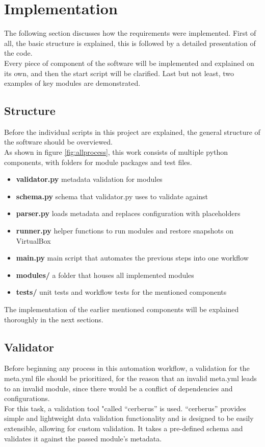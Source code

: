 \chapter{Implementation}
The following section discusses how the requirements were implemented. First of all, the basic structure is explained, this is followed by a detailed presentation of the code.\\
Every piece of component of the software will be implemented and explained on its own, and then the start script will be clarified. Last but not least, two examples of key modules are demonstrated.\\

\section{Structure}
Before the individual scripts in this project are explained, the general structure of the software should be overviewed.\\
As shown in figure \ref{fig:allprocess}, this work consists of multiple python components, with folders for module packages and test files.\\

\begin{itemize}
  \item \textbf{validator.py} metadata validation for modules
  \item \textbf{schema.py} schema that validator.py uses to validate against
  \item \textbf{parser.py} loads metadata and replaces configuration with placeholders
  \item \textbf{runner.py} helper functions to run modules and restore snapshots on VirtualBox
  \item \textbf{main.py} main script that automates the previous steps into one workflow
  \item \textbf{modules/} a folder that houses all implemented modules
  \item \textbf{tests/} unit tests and workflow tests for the mentioned components
\end{itemize}
The implementation of the earlier mentioned components will be explained thoroughly in the next sections.\\


\section{Validator}
Before beginning any process in this automation workflow, a validation for the meta.yml file should be prioritized, for the reason that an invalid meta.yml leads to an invalid module, since there would be a conflict of dependencies and configurations.\\
For this task, a validation tool "called “cerberus” is used. “cerberus” provides simple and lightweight data validation functionality and is designed to be easily extensible, allowing for custom validation\cite{cerberus}. It takes a pre-defined schema and validates it against the passed module’s metadata.

